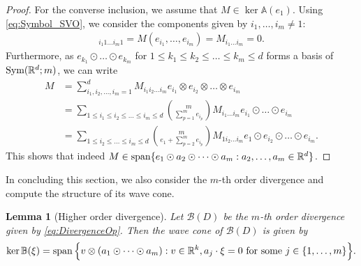 \documentclass[a4paper, 10pt, twoside, notitlepage]{amsart}
\theoremstyle{plain}
\newtheorem{lem}[prop]{Lemma}
\newcommand{\R}{\mathbb{R}}
\renewcommand{\AA}{\mathbb{A}}
\renewcommand{\S}[1]{\textup{Sym}(\R^d;#1)}
\begin{document}
\begin{proof}
		For the converse inclusion, we assume that $M \in \ker \AA(e_1)$. Using \eqref{eq:Symbol_SVO}, we consider the components given by $i_1,\dots,i_m \neq 1$:
			\begin{align*} [\AA(e_1)M]_{i_1 1 \dots i_m 1} = M(e_{i_1}, \dots, e_{i_m}) = M_{i_1 \dots i_m} = 0.
			\end{align*}
			Furthermore, as $e_{k_1} \odot \dots \odot e_{k_m}$ for $1 \leq k_1 \leq k_2 \leq \dots \leq k_m \leq d$ forms a basis of $\S{m}$, we can write
			\begin{align*}
				M & = \sum_{i_1,i_2,\dots,i_m = 1}^d M_{i_1 i_2 \dots i_m} e_{i_1} \otimes e_{i_2} \otimes \dots \otimes e_{i_m} \\
				& = \sum_{1 \leq i_1 \leq i_2 \leq \dots \leq i_m \leq d} \binom{m}{\sum_{p=1}^m e_{i_p}} M_{i_1 \dots i_m} e_{i_1} \odot \dots \odot e_{i_m}\\
				& = \sum_{1 \leq i_2 \leq \dots \leq i_m \leq d} \binom{m}{e_1 + \sum_{p=2}^m e_{i_p}} M_{1 i_2 \dots i_m} e_1 \odot e_{i_2} \odot \dots \odot e_{i_m}.
			\end{align*}
			This shows that indeed $M \in \vspan\{e_1 \odot a_2 \odot \dots \odot a_m: a_2,\dots,a_m \in \R^d\}$.
		\end{proof}
		
		In concluding this section, we also consider the $m$-th order divergence and compute the structure of its wave
		cone.
		
		\begin{lem}[Higher order divergence] \label{rmk:Divergence} Let $\mathcal{B}(D)$ be the $m$-th order divergence given by \eqref{eq:DivergenceOp}.			
                  Then the wave cone of $\mathcal{B}(D)$ is given by
			\begin{align*}
				\ker \mathbb{B}(\xi) = \vspan \Big\{ v \otimes (a_1 \odot \dots \odot a_m): v \in \R^k,  a_j \cdot \xi = 0 \text{ for some } j \in \{1,\dots,m\} \Big\}.
			\end{align*}
                      \end{lem}
                      
\end{document}
